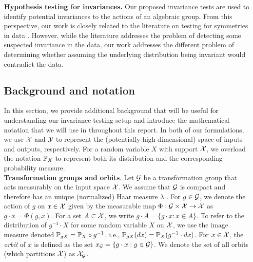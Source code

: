 \textbf{Hypothesis testing for invariances.}
Our proposed invariance tests are used to identify potential invariances to the actions of an algebraic group. From this perspective, our work is closely related to the literature on testing for symmetries in data \parencite{Henze:2003,NgatchouWandji:2009,Partlett:2015}. However, while the literature addresses the problem of detecting some suspected invariance in the data, our work addresses the different problem of determining whether assuming the underlying distribution being invariant would contradict the data.

\subsection{Background and notation} \label{sec:background}

In this section, we provide additional background that will be useful for understanding our invariance testing setup and introduce the mathematical notation that we will use in throughout this report. In both of our formulations, we use $\calX$ and $\calY$ to represent the (potentially high-dimensional) space of inputs and outputs, respectively. For a random variable $X$ with support $\calX$, we overload the notation $\P_X$ to represent both its distribution and the corresponding probability measure.
\\

\textbf{Transformation groups and orbits}. Let $\calG$ be a transformation group that acts measurably on the input space $\calX$. We assume that $\calG$ is compact and therefore has an unique (normalized) Haar measure $\lambda$ \parencite[Theorem~2.10]{Folland:2016}. For $g\in\calG$, we denote the action of $g$ on $x\in\calX$ given by the measurable map $\Phi:\calG\times\calX\rightarrow\calX$ as $g\cdot x = \Phi(g,x)$. For a set $A\subset\calX$, we write $g\cdot A=\{g\cdot x: x\in A\}$. To refer to the distribution of $g^{-1}\cdot X$ for some random variable $X$ on $\calX$, we use the image measure denoted $\P_{gX}=\P_X\circ g^{-1}$, i.e., $\P_{gX}(dx)=\P_X(g^{-1}\cdot dx)$. For $x\in\calX$, the \textit{orbit} of $x$ is defined as the set $x_\calG=\{g\cdot x:g\in\calG\}$. We denote the set of all orbits (which partitions $\calX$) as $\calX_\calG$.
\\

